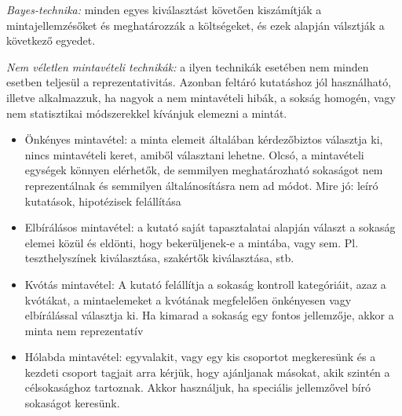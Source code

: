 \emph{Bayes-technika:} minden egyes kiválasztást követően kiszámítják a mintajellemzésőket és meghatározzák a költségeket, és ezek alapján válsztják a következő egyedet.

\emph{Nem véletlen mintavételi technikák:} a ilyen technikák esetében nem minden esetben teljesül a reprezentativitás. Azonban feltáró kutatáshoz jól használható, illetve alkalmazzuk, ha nagyok a nem mintavételi hibák, a sokság homogén, vagy nem statisztikai módszerekkel kívánjuk elemezni a mintát.
\begin{itemize}
\item Önkényes mintavétel: a minta elemeit általában kérdezőbiztos választja ki, nincs mintavételi keret, amiből választani lehetne. Olcsó, a mintavételi egységek könnyen elérhetők, de semmilyen meghatározható sokaságot nem reprezentálnak és semmilyen általánosításra nem ad módot. Mire jó: leíró kutatások, hipotézisek felállítása
\item Elbírálásos mintavétel: a kutató saját tapasztalatai alapján választ a sokaság elemei közül és eldönti, hogy bekerüljenek-e a mintába, vagy sem. Pl. teszthelyszínek kiválasztása, szakértők kiválasztása, stb.
\item Kvótás mintavétel: A kutató felállítja a sokaság kontroll kategóriáit, azaz a kvótákat, a mintaelemeket a kvótának megfelelően önkényesen vagy elbírálással választja ki. Ha kimarad a sokaság egy fontos jellemzője, akkor a minta nem reprezentatív
\item Hólabda mintavétel: egyvalakit, vagy egy kis csoportot megkeresünk és a kezdeti csoport tagjait arra kérjük, hogy ajánljanak másokat, akik szintén a célsokasághoz tartoznak. Akkor használjuk, ha speciális jellemzővel bíró sokaságot keresünk.
\end{itemize}

